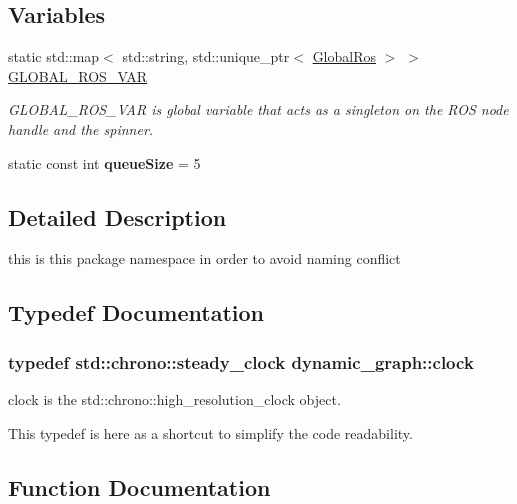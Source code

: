 \subsection*{Variables}
\begin{DoxyCompactItemize}
\item 
static std\+::map$<$ std\+::string, std\+::unique\+\_\+ptr$<$ \hyperlink{structdynamic__graph_1_1GlobalRos}{Global\+Ros} $>$ $>$ \hyperlink{namespacedynamic__graph_a877a1ed0d2adf7f675abf17f70b936a6}{G\+L\+O\+B\+A\+L\+\_\+\+R\+O\+S\+\_\+\+V\+AR}
\begin{DoxyCompactList}\small\item\em G\+L\+O\+B\+A\+L\+\_\+\+R\+O\+S\+\_\+\+V\+AR is global variable that acts as a singleton on the R\+OS node handle and the spinner. \end{DoxyCompactList}\item 
static const int {\bfseries queue\+Size} = 5\hypertarget{namespacedynamic__graph_a9394ef64acc51dd774b27249864f6c33}{}\label{namespacedynamic__graph_a9394ef64acc51dd774b27249864f6c33}

\end{DoxyCompactItemize}


\subsection{Detailed Description}
this is this package namespace in order to avoid naming conflict 

\subsection{Typedef Documentation}
\subsubsection[{\texorpdfstring{clock}{clock}}]{\setlength{\rightskip}{0pt plus 5cm}typedef std\+::chrono\+::steady\+\_\+clock {\bf dynamic\+\_\+graph\+::clock}}\hypertarget{namespacedynamic__graph_aca70acb5331a18e090e49b3d85290a7e}{}\label{namespacedynamic__graph_aca70acb5331a18e090e49b3d85290a7e}


clock is the std\+::chrono\+::high\+\_\+resolution\+\_\+clock object. 

This typedef is here as a shortcut to simplify the code readability. 

\subsection{Function Documentation}
